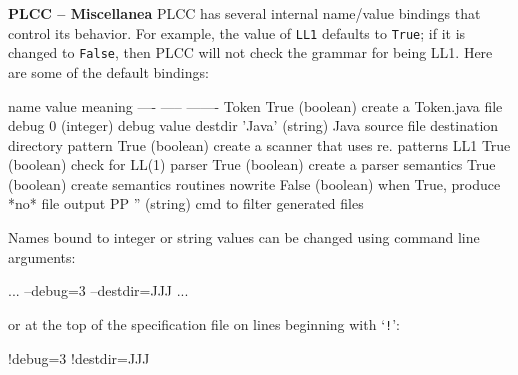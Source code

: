 \begin{minipage}[t]{\sw}
\slidenumber
\Large
{\bf PLCC -- Miscellanea}\exx
PLCC has several internal name/value bindings that control its behavior.
For example, the value of \verb'LL1' defaults to \verb'True';
if it is changed to \verb'False',
then PLCC will not check the grammar for being LL1.
Here are some of the default bindings:
\begin{qv}
name      value  meaning
----      -----  -------
Token     True   (boolean) create a Token.java file
debug     0      (integer) debug value
destdir   'Java' (string)  Java source file destination directory
pattern   True   (boolean) create a scanner that uses re. patterns
LL1       True   (boolean) check for LL(1)
parser    True   (boolean) create a parser
semantics True   (boolean) create semantics routines
nowrite   False  (boolean) when True, produce *no* file output
PP        ''     (string)  cmd to filter generated files
\end{qv}
Names bound to integer or string values can be changed
using command line arguments:
\begin{qv}
... --debug=3 --destdir=JJJ ...
\end{qv}
or at the top of the specification file
on lines beginning with `\verb'!'':
\begin{qv}
!debug=3
!destdir=JJJ
\end{qv}
\end{minipage}
\clearpage
